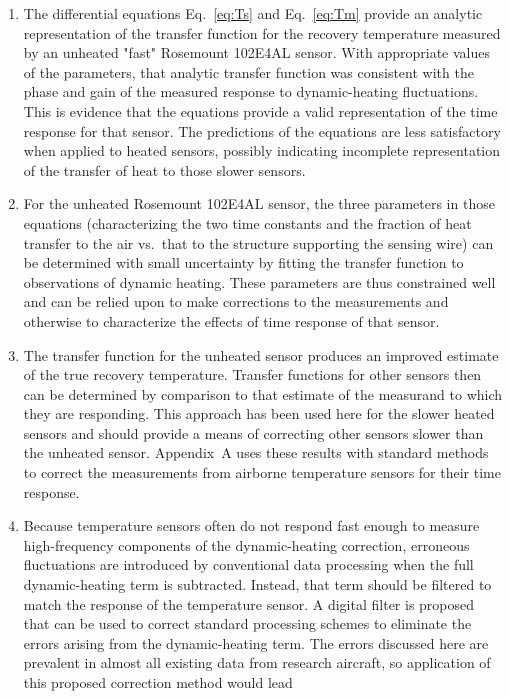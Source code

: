 \documentclass[amt, manuscript]{copernicus}
\begin{document}
\begin{enumerate}
\item The differential equations Eq.\ \eqref{eq:Ts} and Eq.\ \eqref{eq:Tm}
provide an analytic representation of the
transfer function for the recovery temperature measured by an unheated "fast" 
Rosemount 102E4AL
sensor. With appropriate values of the parameters, that analytic transfer function was consistent 
with the phase and gain of the measured response
to dynamic-heating fluctuations. This is evidence that the equations
provide a valid representation of the time response for that sensor.
The predictions of the equations are less satisfactory when applied
to heated sensors, possibly indicating incomplete representation of
the transfer of heat to those slower sensors.
\item For the unheated Rosemount 102E4AL sensor, the three parameters in those equations
(characterizing the two time constants and the fraction of heat transfer
to the air vs.\ that to the structure supporting the sensing wire)
can be determined with small uncertainty by fitting the transfer function
to observations of dynamic heating. These parameters are thus constrained
well and can be relied upon to make corrections to the measurements
and otherwise to characterize the effects of time response of that
sensor.
\item The transfer function for the unheated sensor produces an 
improved estimate of the true recovery temperature. 
Transfer functions for other sensors then can be determined by
comparison to that estimate of the measurand to which they are responding.
This approach has been used here for the slower heated sensors and
should provide a means of correcting other sensors slower than the
unheated sensor. Appendix\ A uses these results with standard methods
to correct the measurements from airborne temperature sensors for
their time response.
\item Because temperature sensors often do not respond fast enough to measure
high-frequency components of the dynamic-heating correction, erroneous
fluctuations are introduced by conventional data processing when the full dynamic-heating term is subtracted. Instead,
that term should be filtered to match the response of the temperature
sensor. A digital filter is
proposed that can be used to correct standard processing schemes to
eliminate the errors arising from the dynamic-heating term. The errors
discussed here are prevalent in almost all existing data from research
aircraft, so application of this proposed correction method would lead

\end{enumerate}
\end{document}
